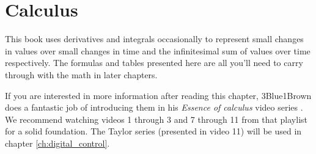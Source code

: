 
\chapter{Calculus}

This book uses derivatives and integrals occasionally to represent small changes
in values over small changes in time and the infinitesimal sum of values over
time respectively. The formulas and tables presented here are all you'll need to
carry through with the math in later chapters.

If you are interested in more information after reading this chapter,
3Blue1Brown does a fantastic job of introducing them in his \textit{Essence of
calculus} video series \cite{bib:essence_of_calculus}. We recommend watching
videos 1 through 3 and 7 through 11 from that playlist for a solid foundation.
The Taylor series (presented in video 11) will be used in chapter
\ref{ch:digital_control}.

\renewcommand*{\chapterpath}{\partpath/calculus}



